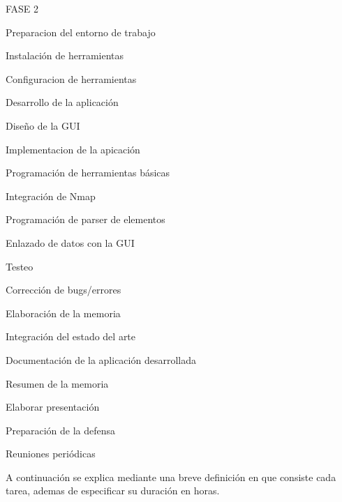 \begin{numbered}
	\item FASE 2
	\begin{numbered}
		\item Preparacion del entorno de trabajo
		\begin{numbered}
			\item Instalación de herramientas
			\item Configuracion de herramientas
		\end{numbered}
		
		\item Desarrollo de la aplicación
		\begin{numbered}
			\item Diseño de la GUI
			\item Implementacion de la apicación
			\begin{numbered}
				\item Programación de herramientas básicas
				\item Integración de Nmap
				\item Programación de parser de elementos
				\item Enlazado de datos con la GUI
			\end{numbered}
			\item Testeo
			\item Corrección de bugs/errores
		\end{numbered}
	\end{numbered}
	
	\item Elaboración de la memoria
	\begin{numbered}
		\item Integración del estado del arte
		\item Documentación de la aplicación desarrollada
		\item Resumen de la memoria
		\item Elaborar presentación
		\item Preparación de la defensa
	\end{numbered}
	
	\item Reuniones periódicas
\end{numbered}

A continuación se explica mediante una breve definición en que consiste cada tarea, ademas de especificar su duración en horas.

